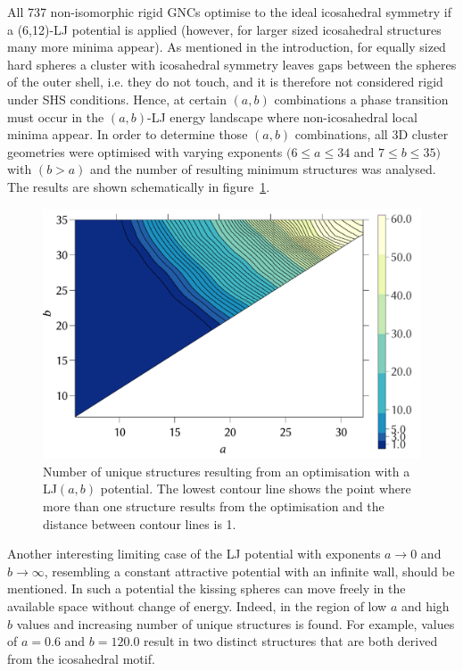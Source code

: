 All 737 non-isomorphic rigid \acp{GNC} optimise to the ideal icosahedral
symmetry if a (6,12)-\ac{LJ} potential is applied
\autocite{Trombach_stickyhardsphereLennardJonestypeclusters_2018} (however, for
larger sized icosahedral structures many more minima
appear).\autocite{Doye-1995,Wales_TheoreticalPredictionsStructure_1996,Doye_effectrangepotential_1996,Doye_Structuralconsequencesrange_1997}
As mentioned in the introduction, for equally sized hard spheres a cluster with
icosahedral symmetry leaves gaps between the spheres of the outer shell, i.e.
they do not touch, and it is therefore not considered rigid under SHS
conditions. Hence, at certain $(a,b)$ combinations a phase transition must occur
in the $(a,b)$-\ac{LJ} energy landscape where non-icosahedral local minima
appear. In order to determine those $(a,b)$ combinations, all 3D cluster
geometries were optimised with varying exponents $(6\leq a \leq 34$ and $7\leq
b\leq 35)$ with $(b>a)$ and the number of resulting minimum structures was
analysed. The results are shown schematically in figure~\ref{fig:ico-2d}.
%
\begin{figure}[htb]\centering
    \includegraphics[width=.8\columnwidth]{gregory-newton/ico-2d.pdf}
    \caption{Number of unique structures resulting from an optimisation with a
    LJ$(a,b)$ potential. The lowest contour line shows the point where more
    than one structure results from the optimisation and the distance between
    contour lines is 1.}
    \label{fig:ico-2d}
\end{figure}

Another interesting limiting case of the \ac{LJ} potential with exponents $a\to
0$ and $b\to \infty$, resembling a constant attractive potential with an
infinite wall, should be mentioned. In such a potential the kissing spheres can
move freely in the available space without change of energy. Indeed, in the
region of low $a$ and high $b$ values and increasing number of unique structures
is found. For example, values of $a=0.6$ and $b=120.0$ result in two distinct
structures that are both derived from the icosahedral motif.

